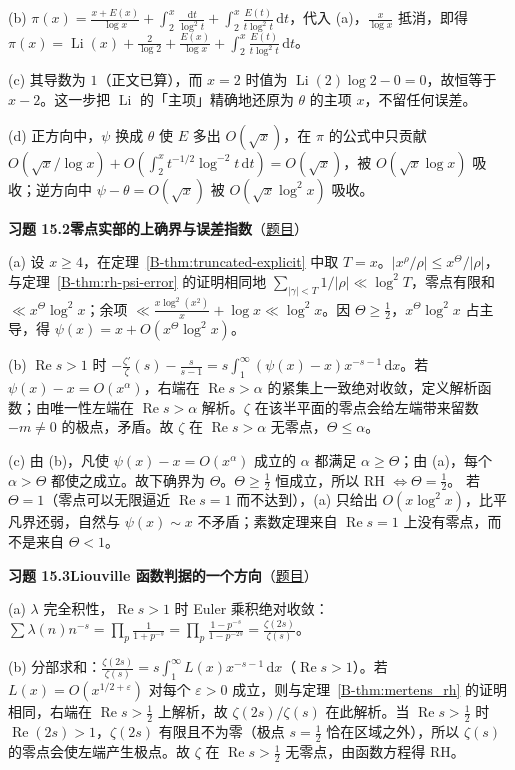 \documentclass[11pt,a4paper]{article}
\DeclareMathOperator{\Li}{Li}
\newcommand{\dd}{\,\mathrm{d}}
\renewcommand{\Re}{\operatorname{Re}}
\newcommand{\bref}[1]{\ref*{B-#1}}
\newcommand{\Sol}[2]{%
  \par\addvspace{1.2em}\noindent
  \hypertarget{s:#1}{}\textbf{习题 #1\quad #2}\hfill{\small（\hyperlink{q:#1}{题目}）}\par
  \nopagebreak\smallskip}
\begin{document}
(b) $\pi(x)=\frac{x+E(x)}{\log x}+\int_2^x\frac{\dd t}{\log^2t}+\int_2^x\frac{E(t)}{t\log^2t}\dd t$，代入 (a)，$\frac x{\log x}$ 抵消，即得 $\pi(x)=\Li(x)+\frac2{\log2}+\frac{E(x)}{\log x}+\int_2^x\frac{E(t)}{t\log^2t}\dd t$。

(c) 其导数为 $1$（正文已算），而 $x=2$ 时值为 $\Li(2)\log2-0=0$，故恒等于 $x-2$。这一步把 $\Li$ 的「主项」精确地还原为 $\theta$ 的主项 $x$，不留任何误差。

(d) 正方向中，$\psi$ 换成 $\theta$ 使 $E$ 多出 $O(\sqrt x)$，在 $\pi$ 的公式中只贡献 $O(\sqrt x/\log x)+O(\int_2^x t^{-1/2}\log^{-2}t\dd t)=O(\sqrt x)$，被 $O(\sqrt x\log x)$ 吸收；逆方向中 $\psi-\theta=O(\sqrt x)$ 被 $O(\sqrt x\log^2x)$ 吸收。

\Sol{15.2}{零点实部的上确界与误差指数}
(a) 设 $x\ge4$，在定理~\bref{thm:truncated-explicit} 中取 $T=x$。$|x^\rho/\rho|\le x^\Theta/|\rho|$，与定理~\bref{thm:rh-psi-error} 的证明相同地 $\sum_{|\gamma|<T}1/|\rho|\ll\log^2T$，零点有限和 $\ll x^\Theta\log^2x$；余项 $\ll\frac{x\log^2(x^2)}x+\log x\ll\log^2x$。因 $\Theta\ge\frac12$，$x^\Theta\log^2x$ 占主导，得 $\psi(x)=x+O(x^\Theta\log^2x)$。

(b) $\Re s>1$ 时 $-\frac{\zeta'}{\zeta}(s)-\frac s{s-1}=s\int_1^\infty(\psi(x)-x)x^{-s-1}\dd x$。若 $\psi(x)-x=O(x^\alpha)$，右端在 $\Re s>\alpha$ 的紧集上一致绝对收敛，定义解析函数；由唯一性左端在 $\Re s>\alpha$ 解析。$\zeta$ 在该半平面的零点会给左端带来留数 $-m\neq0$ 的极点，矛盾。故 $\zeta$ 在 $\Re s>\alpha$ 无零点，$\Theta\le\alpha$。

(c) 由 (b)，凡使 $\psi(x)-x=O(x^\alpha)$ 成立的 $\alpha$ 都满足 $\alpha\ge\Theta$；由 (a)，每个 $\alpha>\Theta$ 都使之成立。故下确界为 $\Theta$。$\Theta\ge\frac12$ 恒成立，所以 RH $\iff\Theta=\frac12$。
若 $\Theta=1$（零点可以无限逼近 $\Re s=1$ 而不达到），(a) 只给出 $O(x\log^2x)$，比平凡界还弱，自然与 $\psi(x)\sim x$ 不矛盾；素数定理来自 $\Re s=1$ 上没有零点，而不是来自 $\Theta<1$。

\Sol{15.3}{Liouville 函数判据的一个方向}
(a) $\lambda$ 完全积性，$\Re s>1$ 时 Euler 乘积绝对收敛：$\sum\lambda(n)n^{-s}=\prod_p\frac1{1+p^{-s}}=\prod_p\frac{1-p^{-s}}{1-p^{-2s}}=\frac{\zeta(2s)}{\zeta(s)}$。

(b) 分部求和：$\frac{\zeta(2s)}{\zeta(s)}=s\int_1^\infty L(x)x^{-s-1}\dd x$（$\Re s>1$）。若 $L(x)=O(x^{1/2+\varepsilon})$ 对每个 $\varepsilon>0$ 成立，则与定理~\bref{thm:mertens_rh} 的证明相同，右端在 $\Re s>\frac12$ 上解析，故 $\zeta(2s)/\zeta(s)$ 在此解析。当 $\Re s>\frac12$ 时 $\Re(2s)>1$，$\zeta(2s)$ 有限且不为零（极点 $s=\frac12$ 恰在区域之外），所以 $\zeta(s)$ 的零点会使左端产生极点。故 $\zeta$ 在 $\Re s>\frac12$ 无零点，由函数方程得 RH。
\end{document}
